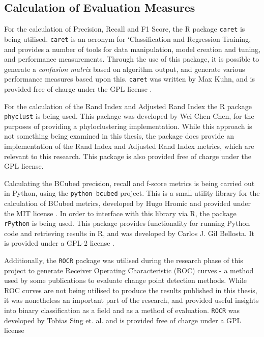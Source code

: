 \documentclass{uvamscse}	%
\begin{document}
\subsection{Calculation of Evaluation Measures}


For the calculation of Precision, Recall and F1 Score, the \textsf{R} package \texttt{caret} is being utilised. \texttt{caret} is an acronym for `Classification and Regression Training, and provides a number of tools for data manipulation, model creation and tuning, and performance measurements. Through the use of this package, it is possible to generate a \emph{confusion matrix} based on algorithm output, and generate various performance measures based upon this. \texttt{caret} was written by Max Kuhn, and is provided free of charge under the GPL license \cite{FromJedWing2017}.

For the calculation of the Rand Index and Adjusted Rand Index the \textsf{R} package \texttt{phyclust} is being used. This package was developed by Wei-Chen Chen, for the purposes of providing a phyloclustering implementation. While this approach is not something being examined in this thesis, the package does provide an implementation of the Rand Index and Adjusted Rand Index metrics, which are relevant to this research. This package is also provided free of charge under the GPL license.

Calculating the BCubed precision, recall and f-score metrics is being carried out in Python, using the \texttt{python-bcubed} project. This is a small utility library for the calculation of BCubed metrics, developed by Hugo Hromic and provided under the MIT license \cite{Hromic2016}. In order to interface with this library via \textsf{R}, the package \texttt{rPython} is being used. This package provides functionality for running Python code and retrieving results in \textsf{R}, and was developed by Carlos J. Gil Bellosta. It is provided under a GPL-2 license \cite{Bellosta2015}.

Additionally, the \texttt{ROCR} package was utilised during the research phase of this project to generate Receiver Operating Characteristic (ROC) curves - a method used by some publications to evaluate change point detection methods. While ROC curves are not being utilised to produce the results published in this thesis, it was nonetheless an important part of the research, and provided useful insights into binary classification as a field and as a method of evaluation. \texttt{ROCR} was developed by Tobias Sing et. al. and is provided free of charge under a GPL license \cite{Chen2011}
\end{document}
